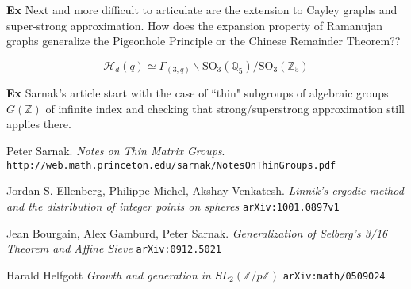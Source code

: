 \documentclass[12pt]{article}
\begin{document}
{\noindent \textbf{Ex} Next and more difficult to articulate are the extension to Cayley graphs and super-strong approximation. How does the expansion property of Ramanujan graphs generalize the Pigeonhole Principle or the Chinese Remainder Theorem??

$$ \mathcal{H}_d(q) \simeq \Gamma_{(3,q)} \backslash \mathrm{SO}_3(\mathbb{Q}_5) / \mathrm{SO}_3(\mathbb{Z}_5)$$

\noindent \textbf{Ex} Sarnak's article start with the case of ``thin" subgroups of algebraic groups $G(\mathbb{Z})$ of infinite index and checking that strong/superstrong approximation still applies there.  \cite{BGS, H}

\begin{thebibliography}{9}
Peter Sarnak.
\textit{Notes on Thin Matrix Groups}.  \newline
\texttt{http://web.math.princeton.edu/sarnak/NotesOnThinGroups.pdf}
 
Jordan S. Ellenberg, Philippe Michel, Akshay Venkatesh. \textit{Linnik's ergodic method and the distribution of integer points on spheres}   \texttt{arXiv:1001.0897v1}

Jean Bourgain, Alex Gamburd, Peter Sarnak. \textit{Generalization of Selberg's 3/16 Theorem and Affine Sieve }
\texttt{arXiv:0912.5021}

 Harald Helfgott
\textit{Growth and generation in $SL_2(\mathbb{Z}/p\mathbb{Z})$}
\texttt{arXiv:math/0509024}

\end{thebibliography}
}
\end{document}
